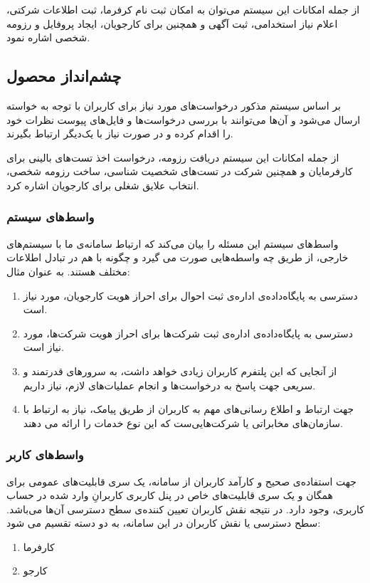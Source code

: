 \documentclass[12pt,svgnames,oneside]{book}
\begin{document}
			از جمله امکانات این سیستم می‌توان به امکان ثبت نام کرفرما، ثبت اطلاعات شرکتی، اعلام نیاز استخدامی، ثبت آگهی و همچنین برای کارجویان، ایجاد پروفایل و رزومه شخصی اشاره نمود.

			\subsection{چشم‌انداز محصول}
				بر اساس سیستم مذکور درخواست‌های مورد نیاز برای کاربران با توجه به خواسته ارسال می‌شود و آن‌ها می‌توانند با بررسی درخواست‌ها و فایل‌های پیوست نظرات خود را اقدام کرده و در صورت نیاز با یک‌دیگر ارتباط بگیرند.

				از جمله امکانات این سیستم دریافت رزومه، درخواست اخذ تست‌های بالینی برای کارفرمایان و همچنین شرکت در تست‌های شخصیت شناسی، ساخت رزومه شخصی، انتخاب علایق شغلی برای کارجویان اشاره کرد.

				\subsubsection{واسط‌های سیستم}
					واسط‌های سیستم این مسئله را بیان می‌کند که ارتباط سامانه‌ی ما با سیستم‌های خارجی، از طریق چه واسطه‌هایی صورت می گیرد و چگونه با هم در تبادل اطلاعات مختلف هستند. به عنوان مثال:
					\begin{enumerate}
						\item
	دسترسی به پایگاه‌داده‌ی اداره‌ی ثبت احوال برای احراز هویت کارجو‌یان، مورد نیاز است.
						\item
	دسترسی به پایگاه‌داده‌ی اداره‌ی ثبت شرکت‌ها برای احراز هویت شرکت‌ها، مورد نیاز است.
						\item
	از آنجایی که این پلتفرم کاربران زیادی خواهد داشت، به سرور‌های قدرتمند و سریعی جهت پاسخ به درخواست‌ها و انجام عملیات‌های لازم، نیاز داریم.
						\item
	جهت ارتباط و اطلاع رسانی‌های مهم به کاربران از طریق پیامک، نیاز به ارتباط با سازمان‌های مخابراتی یا شرکت‌هایی‌ست که این نوع خدمات را ارائه می دهند.
					\end{enumerate}
				\subsubsection{واسط‌های کاربر}
					جهت استفاده‌ی صحیح و کارآمد کاربران از سامانه، یک سری قابلیت‌های عمومی برای همگان و یک سری قابلیت‌های خاص در پنل کاربری کاربرانِ وارد شده در حساب کاربری، وجود دارد. در نتیجه نقش کاربران تعیین کننده‌ی سطح دسترسی آن‌ها می‌باشد.
					سطح‌ دسترسی یا نقش کاربران در این سامانه، به دو دسته تقسیم می شود:
					\begin{enumerate}
						\item کارفرما
						\item کارجو
					\end{enumerate}
\end{document}
